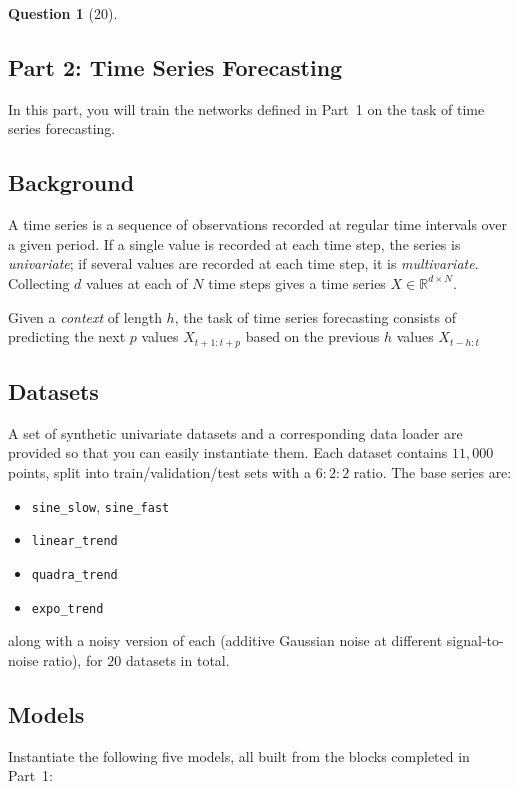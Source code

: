 \documentclass[12pt]{article}
\theoremstyle{definition}
\newtheorem{exercise}{Question}%
\begin{document}
\begin{exercise}[20]
{\subsection*{Part 2: Time Series Forecasting}

In this part, you will train the networks defined in Part~1 on the task of time series
forecasting.

\subsection*{Background}

A time series is a sequence of observations recorded at regular time intervals over a given
period. If a single value is recorded at each time step, the series is \emph{univariate}; if
several values are recorded at each time step, it is \emph{multivariate}. Collecting $d$
values at each of $N$ time steps gives a time series $X \in \mathbb{R}^{d \times N}$.

Given a \emph{context} of length $h$, the task of time series forecasting consists of predicting the next $p$
values $X_{t+1:t+p}$ based on the previous $h$ values $X_{t-h:t}$
\subsection*{Datasets}

A set of synthetic univariate datasets and a corresponding data loader are provided so that
you can easily instantiate them. Each dataset contains $11{,}000$ points, split into
train/validation/test sets with a $6:2:2$ ratio. The base series are:
\begin{itemize}[nosep]
    \item \texttt{sine\_slow}, \texttt{sine\_fast}
    \item \texttt{linear\_trend}
    \item \texttt{quadra\_trend}
    \item \texttt{expo\_trend}
\end{itemize}
along with a noisy version of each (additive Gaussian noise at different signal-to-noise
ratio), for $20$ datasets in total.

\subsection*{Models}

Instantiate the following five models, all built from the blocks completed in Part~1:

}
\end{exercise}
\end{document}
